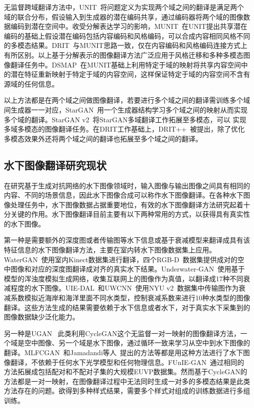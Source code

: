 无监督跨域翻译方法中，UNIT~\cite{liu2017unsupervised}将问题定义为实现两个域之间的翻译是满足两个域的联合分布，假设输入到生成器的潜在编码共享，通过编码器将两个域的图像数据编码到潜在空间中。收受分解表达学习的影响，MUNIT~\cite{huang2018multimodal}在UNIT提出共享潜在编码的基础上假设潜在编码包括内容编码和风格编码，可以合成内容相同风格不同的多模态结果。DRIT~\cite{lee2018diverse}与MUNIT思路一致，仅在内容编码和风格编码连接方式上有所区别。以上基于分解表示的图像翻译方法广泛应用于风格迁移和多种多模态图像翻译任务中。DSMAP~\cite{chang2020domain}在MUNIT基础上利用特定于域的映射将共享内容空间中的潜在特征重新映射于特定于域的内容空间，这样保证特定于域的内容空间不含有源域的任何信息。

以上方法都是在两个域之间做图像翻译，若要进行多个域之间的翻译需训练多个域间生成器一一对应，StarGAN~\cite{choi2018stargan}用一个生成器结构学习多个域之间的映射从而实现多个域的翻译。StarGAN v2~\cite{choi2020stargan}将StarGAN多域翻译工作拓展至多模态，可以 实现多域多模态的图像翻译任务。在DRIT工作基础上，DRIT++~\cite{lee2020drit++}被提出，除了优化多模态效果外还将两个域之间的翻译也拓展至多个域之间的翻译。


\subsection{水下图像翻译研究现状} 
在研究基于生成对抗网络的水下图像领域时，输入图像与输出图像之间具有相同的内容、不同的场景信息，因此水下图像合成可以称作水下图像翻译。在各种水下图像处理任务中，水下图像数据占据重要地位，有效的水下图像翻译方法研究起着十分关键的作用。水下图像翻译目前主要有以下两种常用的方式，以获得具有真实性的水下图像。

第一种是需要额外的深度图或者传输图等水下信息或基于衰减模型来翻译成具有该特征信息的水下图像翻译方法，主要在室内转水下图像数据集上应用。WaterGAN~\cite{li2017watergan}使用室内Kinect数据集进行翻译，四个RGB-D~\cite{janoch2013category,lai2014unsupervised,silberman2011indoor,shotton2013scene}数据集提供成对的空中图像和对应的深度图翻译成对齐的真实水下结果。Underwater-GAN~\cite{yu2018underwater}使用基于模型的浑浊度模拟生成网络，收集互联网上的图像作为真值，以翻译成17种不同衰减程度的水下图像。UIE-DAL~\cite{uplavikar2019all}和UWCNN~\cite{li2020underwater}使用NYU v2~\cite{silberman2012indoor}数据集中传输图作为衰减系数模拟近海岸和海洋里面不同水类型，控制衰减系数来进行10种水类型的图像翻译。这些方法生成的结果需要依赖于水下信息或者水下，对于真实水下采集到的图像数据缺少泛化能力。

另一种是UGAN~
\cite{fabbri2018enhancing}此类利用CycleGAN这个无监督一对一映射的图像翻译方法，一个域是空中图像、另一个域是水下图像，通过循环一致来学习从空中到水下图像的翻译。MLFCGAN~\cite{liu2019mlfCGAN}和Jamadandi等人~\cite{jamadandi2019exemplar}提出的方法等都是用这种方法进行了水下图像翻译，不依赖于任何水下光学模型和任何物理信息。FUnIE-GAN~\cite{islam2020fast}通过相同的方法拓展成包括配对和不配对子集的大规模EUVP数据集。然而基于CycleGAN的方法都是一对一映射，在图像翻译过程中无法同时生成一对多的多模态结果是此类方法存在的问题。欲得到多种样式结果，需要多个样式对组成的训练数据进行多组训练。

